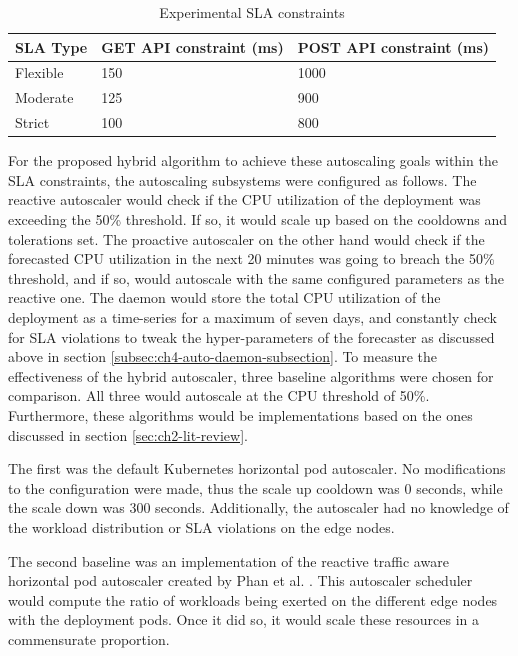 \begin{table}
    \caption{Experimental SLA constraints}\label{tab:experiment-sla-values}
    \centering
    \begin{tabular}{|l|l|l|}
        \hline
        SLA Type & GET API constraint (ms) & POST API constraint (ms)\\
        \hline
        Flexible    & 150   & 1000\\
        Moderate    & 125   & 900\\
        Strict      & 100   & 800\\
        \hline
    \end{tabular}
\end{table}

For the proposed hybrid algorithm to achieve these autoscaling goals within the SLA constraints, the autoscaling subsystems were configured as follows. The reactive autoscaler would check if the CPU utilization of the deployment was exceeding the 50\% threshold. If so, it would scale up based on the cooldowns and tolerations set. The proactive autoscaler on the other hand would check if the forecasted CPU utilization in the next 20 minutes was going to breach the 50\% threshold, and if so, would autoscale with the same configured parameters as the reactive one. The daemon would store the total CPU utilization of the deployment as a time-series for a maximum of seven days, and constantly check for SLA violations to tweak the hyper-parameters of the forecaster as discussed above in section \ref{subsec:ch4-auto-daemon-subsection}. To measure the effectiveness of the hybrid autoscaler, three baseline algorithms were chosen for comparison. All three would autoscale at the CPU threshold of 50\%. Furthermore, these algorithms would be implementations based on the ones discussed in section \ref{sec:ch2-lit-review}.\par

The first was the default Kubernetes horizontal pod autoscaler. No modifications to the configuration were made, thus the scale up cooldown was 0 seconds, while the scale down was 300 seconds. Additionally, the autoscaler had no knowledge of the workload distribution or SLA violations on the edge nodes.\par

The second baseline was an implementation of the reactive traffic aware horizontal pod autoscaler created by Phan et al. \cite{phan2022traffic}. This autoscaler scheduler would compute the ratio of workloads being exerted on the different edge nodes with the deployment pods. Once it did so, it would scale these resources in a commensurate proportion.\par

